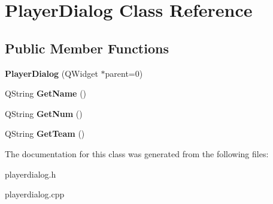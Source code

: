 \hypertarget{classPlayerDialog}{\section{Player\-Dialog Class Reference}
\label{classPlayerDialog}
}
\subsection*{Public Member Functions}
\begin{DoxyCompactItemize}
\item 
\hypertarget{classPlayerDialog_a41ca59c1acdc2f3c1fc7657b0dab0175}{{\bfseries Player\-Dialog} (Q\-Widget $\ast$parent=0)}\label{classPlayerDialog_a41ca59c1acdc2f3c1fc7657b0dab0175}

\item 
\hypertarget{classPlayerDialog_a33050c9714b08b112f3d35640e66deba}{Q\-String {\bfseries Get\-Name} ()}\label{classPlayerDialog_a33050c9714b08b112f3d35640e66deba}

\item 
\hypertarget{classPlayerDialog_a475df1a0286dca259f8ecaf6d0f60f54}{Q\-String {\bfseries Get\-Num} ()}\label{classPlayerDialog_a475df1a0286dca259f8ecaf6d0f60f54}

\item 
\hypertarget{classPlayerDialog_aaf646807bb272755ce306732b5270a3c}{Q\-String {\bfseries Get\-Team} ()}\label{classPlayerDialog_aaf646807bb272755ce306732b5270a3c}

\end{DoxyCompactItemize}


The documentation for this class was generated from the following files\-:\begin{DoxyCompactItemize}
\item 
playerdialog.\-h\item 
playerdialog.\-cpp\end{DoxyCompactItemize}
